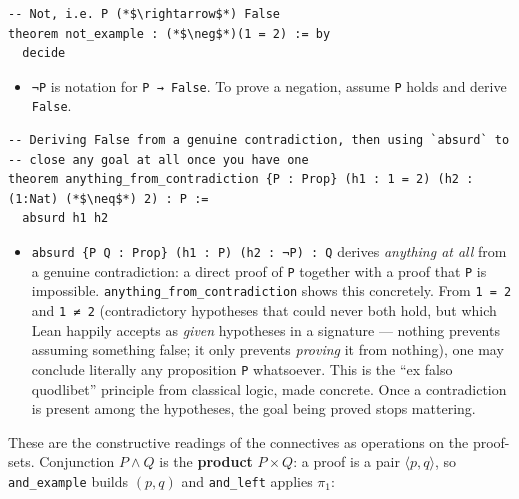 \begin{lstlisting}
-- Not, i.e. P (*$\rightarrow$*) False
theorem not_example : (*$\neg$*)(1 = 2) := by
  decide
\end{lstlisting}

\begin{itemize}
\tightlist
\item
  \texttt{¬P} is notation for \texttt{P → False}. To prove a negation, assume \texttt{P} holds and derive \texttt{False}.
\end{itemize}

\begin{lstlisting}
-- Deriving False from a genuine contradiction, then using `absurd` to
-- close any goal at all once you have one
theorem anything_from_contradiction {P : Prop} (h1 : 1 = 2) (h2 : (1:Nat) (*$\neq$*) 2) : P :=
  absurd h1 h2
\end{lstlisting}

\begin{itemize}
\tightlist
\item
  \texttt{absurd \{P Q : Prop\} (h1 : P) (h2 : ¬P) : Q} derives \emph{anything at all} from a genuine contradiction: a direct proof of \texttt{P} together with a proof that \texttt{P} is impossible. \texttt{anything\_\allowbreak{}from\_\allowbreak{}contradiction} shows this concretely. From \texttt{1 = 2} and \texttt{1 ≠ 2} (contradictory hypotheses that could never both hold, but which Lean happily accepts as \emph{given} hypotheses in a signature --- nothing prevents assuming something false; it only prevents \emph{proving} it from nothing), one may conclude literally any proposition \texttt{P} whatsoever. This is the ``ex falso quodlibet'' principle from classical logic, made concrete. Once a contradiction is present among the hypotheses, the goal being proved stops mattering.
\end{itemize}

\begin{mathreading}

These are the constructive readings of the connectives as operations on the proof-sets. Conjunction \(P \wedge Q\) is the \textbf{product} \(P \times Q\): a proof is a pair \(\langle p, q\rangle\), so \texttt{and\_\allowbreak{}example} builds \((p,q)\) and \texttt{and\_\allowbreak{}left} applies \(\pi_1\):

\end{mathreading}

\begin{center}

\end{center}


